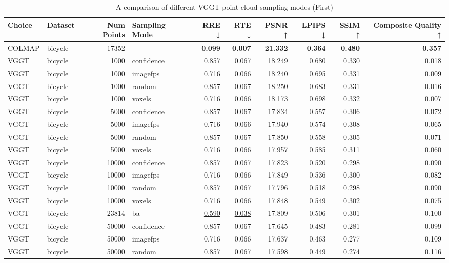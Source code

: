 \begin{table}[H]
\caption{\ifdefined\customcaption \customcaption \else A comparison of different VGGT point cloud sampling modes (First) \fi}
\label{tab:03_sampling_mode_first}
\centering
\scriptsize
\begin{tabular}{llrlrrrrrr}
\toprule
Choice & Dataset & Num Points & Sampling Mode & RRE ↓ & RTE ↓ & PSNR ↑ & LPIPS ↓ & SSIM ↑ & Composite Quality ↑ \\
\midrule
COLMAP & bicycle & 17352 &  & \textbf{0.099} & \textbf{0.007} & \textbf{21.332} & \textbf{0.364} & \textbf{0.480} & \textbf{0.357} \\
VGGT & bicycle & 1000 & confidence & 0.857 & 0.067 & 18.249 & 0.680 & 0.330 & 0.018 \\
VGGT & bicycle & 1000 & imagefps & 0.716 & 0.066 & 18.240 & 0.695 & 0.331 & 0.009 \\
VGGT & bicycle & 1000 & random & 0.857 & 0.067 & \underline{18.250} & 0.683 & 0.331 & 0.016 \\
VGGT & bicycle & 1000 & voxels & 0.716 & 0.066 & 18.173 & 0.698 & \underline{0.332} & 0.007 \\
VGGT & bicycle & 5000 & confidence & 0.857 & 0.067 & 17.834 & 0.557 & 0.306 & 0.072 \\
VGGT & bicycle & 5000 & imagefps & 0.716 & 0.066 & 17.940 & 0.574 & 0.308 & 0.065 \\
VGGT & bicycle & 5000 & random & 0.857 & 0.067 & 17.850 & 0.558 & 0.305 & 0.071 \\
VGGT & bicycle & 5000 & voxels & 0.716 & 0.066 & 17.957 & 0.585 & 0.311 & 0.060 \\
VGGT & bicycle & 10000 & confidence & 0.857 & 0.067 & 17.823 & 0.520 & 0.298 & 0.090 \\
VGGT & bicycle & 10000 & imagefps & 0.716 & 0.066 & 17.849 & 0.536 & 0.300 & 0.082 \\
VGGT & bicycle & 10000 & random & 0.857 & 0.067 & 17.796 & 0.518 & 0.298 & 0.090 \\
VGGT & bicycle & 10000 & voxels & 0.716 & 0.066 & 17.848 & 0.549 & 0.302 & 0.075 \\
VGGT & bicycle & 23814 & ba & \underline{0.590} & \underline{0.038} & 17.809 & 0.506 & 0.301 & 0.100 \\
VGGT & bicycle & 50000 & confidence & 0.857 & 0.067 & 17.645 & 0.483 & 0.281 & 0.099 \\
VGGT & bicycle & 50000 & imagefps & 0.716 & 0.066 & 17.637 & 0.463 & 0.277 & 0.109 \\
VGGT & bicycle & 50000 & random & 0.857 & 0.067 & 17.598 & 0.449 & 0.274 & 0.116 \\

\end{tabular}
\end{table}

